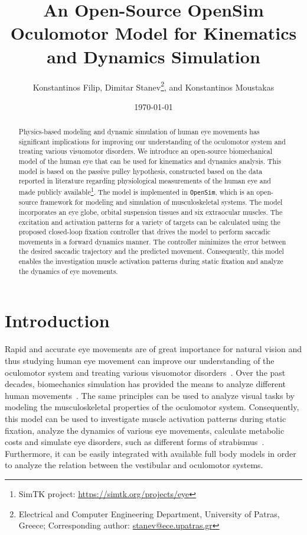 \documentclass[11pt,a4paper,draft=false]{report}
\title{An Open-Source OpenSim Oculomotor Model for Kinematics and Dynamics
  Simulation}
\author{Konstantinos Filip, Dimitar Stanev\footnote{Electrical and Computer
    Engineering Department, University of Patras, Greece; Corresponding
    author: \url{stanev@ece.upatras.gr}}, and Konstantinos Moustakas}
\date{\today}
\begin{document}

\maketitle

\begin{abstract}
  Physics-based modeling and dynamic simulation of human eye movements has
  significant implications for improving our understanding of the oculomotor
  system and treating various visuomotor disorders. We introduce an open-source
  biomechanical model of the human eye that can be used for kinematics and
  dynamics analysis. This model is based on the passive pulley hypothesis,
  constructed based on the data reported in literature regarding physiological
  measurements of the human eye and made publicly available\footnote{SimTK
    project: \url{https://simtk.org/projects/eye}}. The model is implemented in
  \texttt{OpenSim}, which is an open-source framework for modeling and
  simulation of musculoskeletal systems. The model incorporates an eye globe,
  orbital suspension tissues and six extraocular muscles. The excitation and
  activation patterns for a variety of targets can be calculated using the
  proposed closed-loop fixation controller that drives the model to perform
  saccadic movements in a forward dynamics manner. The controller minimizes the
  error between the desired saccadic trajectory and the predicted
  movement. Consequently, this model enables the investigation muscle activation
  patterns during static fixation and analyze the dynamics of eye movements.
\end{abstract}

\section*{Introduction}\label{sec:introduction}

Rapid and accurate eye movements are of great importance for natural vision and
thus studying human eye movement can improve our understanding of the oculomotor
system and treating various visuomotor disorders~\cite{Lee2006, Wei2010a}. Over
the past decades, biomechanics simulation has provided the means to analyze
different human movements~\cite{Delp2007}. The same principles can be used to
analyze visual tasks by modeling the musculoskeletal properties of the
oculomotor system. Consequently, this model can be used to investigate muscle
activation patterns during static fixation, analyze the dynamics of various eye
movements, calculate metabolic costs and simulate eye disorders, such as
different forms of strabismus~\cite{Wong2004}. Furthermore, it can be easily
integrated with available full body models in order to analyze the relation
between the vestibular and oculomotor systems.
\end{document}
